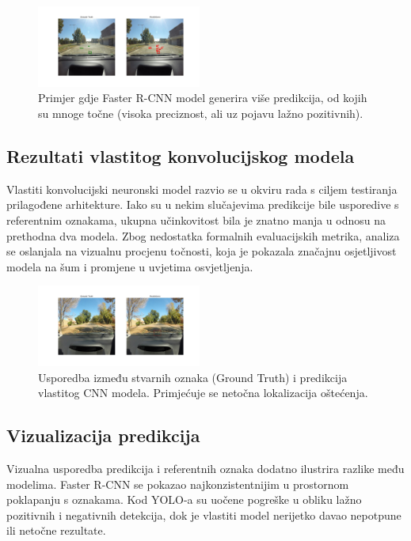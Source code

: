 \documentclass[conference]{IEEEtran}
\begin{document}
\begin{figure}[htbp]
\centerline{\includegraphics[width=0.48\textwidth]{Images/FasterCNNPic.jpg}}
\caption{Primjer gdje Faster R-CNN model generira više predikcija, od kojih su mnoge točne (visoka preciznost, ali uz pojavu lažno pozitivnih).}
\label{fig:fasterrcnn_eval}
\end{figure}


\subsection{Rezultati vlastitog konvolucijskog modela}

Vlastiti konvolucijski neuronski model razvio se u okviru rada s ciljem testiranja prilagođene arhitekture. Iako su u nekim slučajevima predikcije bile usporedive s referentnim oznakama, ukupna učinkovitost bila je znatno manja u odnosu na prethodna dva modela.
Zbog nedostatka formalnih evaluacijskih metrika, analiza se oslanjala na vizualnu procjenu točnosti, koja je pokazala značajnu osjetljivost modela na šum i promjene u uvjetima osvjetljenja.

\begin{figure}[htbp]
\centerline{\includegraphics[width=0.48\textwidth]{Images/CustomCNNPic.jpg}}
\caption{Usporedba između stvarnih oznaka (Ground Truth) i predikcija vlastitog CNN modela. Primjećuje se netočna lokalizacija oštećenja.}
\label{fig:customcnn_eval}
\end{figure}

\subsection{Vizualizacija predikcija}

Vizualna usporedba predikcija i referentnih oznaka dodatno ilustrira razlike među modelima. Faster R-CNN se pokazao najkonzistentnijim u prostornom poklapanju s oznakama. Kod YOLO-a su uočene pogreške u obliku lažno pozitivnih i negativnih detekcija, dok je vlastiti model nerijetko davao nepotpune ili netočne rezultate.
\end{document}
